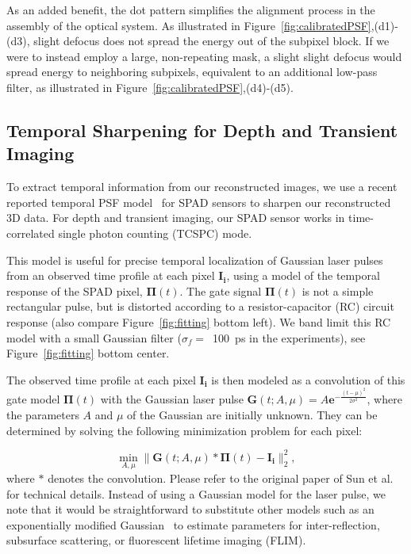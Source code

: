 As an added benefit, the dot pattern simplifies the alignment process
in the assembly of the optical system. As illustrated in
Figure~\ref{fig:calibratedPSF},(d1)-(d3), slight defocus does not
spread the energy out of the subpixel block. If we were to instead
employ a large, non-repeating mask, a slight slight defocus would
spread energy to neighboring subpixels, equivalent to an additional
low-pass filter, as illustrated in
Figure~\ref{fig:calibratedPSF},(d4)-(d5).

\subsection{Temporal Sharpening for Depth and Transient Imaging}
To extract temporal information from our reconstructed images, we
use a recent reported temporal PSF model~\cite{sun2018depth} for SPAD
sensors to sharpen our reconstructed 3D data.  For depth and transient
imaging, our SPAD sensor works in time-correlated single photon
counting (TCSPC) mode.

This model is useful for precise temporal localization of
  Gaussian laser pulses from an observed time profile at each pixel
  $\bm{I_i}$, using a model of the temporal response of the SPAD
  pixel, $\bm{\Pi}(t)$. The gate signal $\bm{\Pi}(t)$ is not a simple
  rectangular pulse, but is distorted according to a
  resistor-capacitor (RC) circuit response (also compare
  Figure~\ref{fig:fitting} bottom left). We band limit this RC model
  with a small Gaussian filter ($\sigma_f=$~100~ps in the
  experiments), see Figure~\ref{fig:fitting} bottom center.  

 The observed time profile at each pixel $\bm{I_i}$ is then
  modeled as a convolution of this gate model $\bm{\Pi}(t)$ with the
  Gaussian laser pulse
  $\bm{G}(t;A,\mu)=A\bm{e}^{-\frac{(t-\mu)^2}{2\sigma^2}}$, where the
  parameters $A$ and $\mu$ of the Gaussian are initially unknown. They
can be determined by solving the following minimization problem for
each pixel:

\begin{equation}
  \label{eqn:psfmodel}
  \min_{A,\mu} \|\mathbf{G}(t;A,\mu)\ast \bm{\Pi}(t) - \bm{I_i} \|_2^2,
\end{equation}
 where $\ast$ denotes the convolution. Please refer to the
  original paper of Sun et al.~ for technical
  details. Instead of using a Gaussian model for the laser pulse, we
  note that it would be straightforward to substitute other models
  such as an exponentially modified Gaussian~\cite{heide2014imaging}
  to estimate parameters for inter-reflection, subsurface scattering,
  or fluorescent lifetime imaging (FLIM).
 
 


